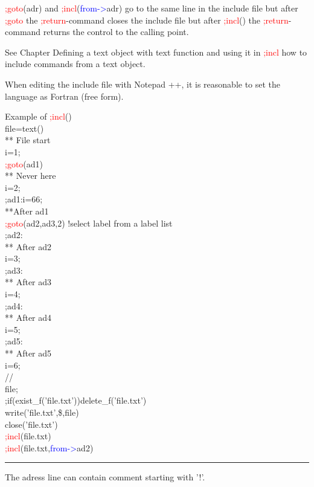 \begin{note} 
\textcolor{Red}{;goto}(adr) and \textcolor{Red}{;incl}(\textcolor{blue}{from->}adr) go to the same line in the include file but after \textcolor{Red}{;goto} the \textcolor{Red}{;return}-command 
closes the include file but after \textcolor{Red}{;incl}() the \textcolor{Red}{;return}-command returns the control to the calling point. 
\end{note} 
\begin{note} 
See Chapter Defining a text object with text function and using it in \textcolor{Red}{;incl} how to include 
commands from a text object. 
\end{note} 
\begin{note} 
When editing the include file with Notepad ++, it is reasonable to set the language as Fortran (free form). 
\end{note} 
\singlespacing 
\begin{example}[inpuincl]Example of \textcolor{Red}{;incl}()\\ 
\label{inpuincl} 
\noindent file=\textcolor{VioletRed}{text}()\\ 
{\color{ForestGreen}** File start}\\ 
i=1;\\ 
\textcolor{Red}{;goto}(ad1)\\ 
{\color{ForestGreen}** Never here}\\ 
i=2;\\ 
;ad1:i=66;\\ 
{\color{ForestGreen}**After ad1}\\ 
\textcolor{Red}{;goto}(ad2,ad3,2)\,\,{\color{ForestGreen}!select label from a label list}\\ 
;ad2:\\ 
{\color{ForestGreen}** After ad2}\\ 
i=3;\\ 
;ad3:\\ 
{\color{ForestGreen}** After ad3}\\ 
i=4;\\ 
;ad4:\\ 
{\color{ForestGreen}** After ad4}\\ 
i=5;\\ 
;ad5:\\ 
{\color{ForestGreen}** After ad5}\\ 
i=6;\\ 
//  \\ 
file;\\ 
;if(\textcolor{VioletRed}{exist\_f}('file.txt'))\textcolor{VioletRed}{delete\_f}('file.txt')\\ 
\textcolor{VioletRed}{write}('file.txt',\$,file)\\ 
\textcolor{VioletRed}{close}('file.txt')\\ 
\textcolor{Red}{;incl}(file.txt)\\ 
\textcolor{Red}{;incl}(file.txt,\textcolor{blue}{from->}ad2)\\ 
\end{example} 
\vspace{-7mm} \rule{5cm}{0.1pt} 
\onehalfspacing 
\begin{note} 
The adress line can contain comment starting with '!'. 
\end{note} 
